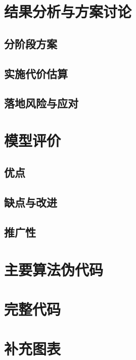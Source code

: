 \documentclass[12pt,a4paper]{ctexart}
\begin{document}
\section{结果分析与方案讨论}

\subsection{分阶段方案}

\subsection{实施代价估算}

\subsection{落地风险与应对}

\section{模型评价}

\subsection{优点}

\subsection{缺点与改进}

\subsection{推广性}





\appendix

\section{主要算法伪代码}

\section{完整代码}


\section{补充图表}
\end{document}
